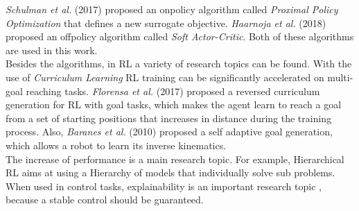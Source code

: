 \emph{Schulman et al.} (2017) \cite{schulman2017proximal} proposed an onpolicy
algorithm called \emph{Proximal Policy Optimization} that defines a new surrogate objective.
\emph{Haarnoja et al.} (2018) \cite{haarnoja2018soft} proposed an offpolicy
algorithm called \emph{Soft Actor-Critic}. Both of these algorithms are used 
in this work.\\
Besides the algorithms, in RL a variety of research topics can be found.
With the use of \emph{Curriculum Learning} \cite{9207427} RL training can 
be significantly accelerated on multi-goal reaching tasks.
\emph{Florensa et al.} (2017) \cite{pmlr-v78-florensa17a} proposed a reversed
curriculum generation for RL with goal tasks, which makes the agent learn to reach a goal 
from a set of starting positions that increases in distance during the training process. 
Also, \emph{Baranes et al.} (2010) \cite{5651385} proposed a self adaptive goal generation, 
which allows a robot to learn its inverse kinematics.\\
The increase of performance is a main research topic. 
For example, Hierarchical RL \cite{botvinick2012hierarchical} aims at 
using a Hierarchy of models that individually solve sub problems.
When used in control tasks, explainability is an important research topic \cite{heuillet2021explainability},
because a stable control should be guaranteed.

